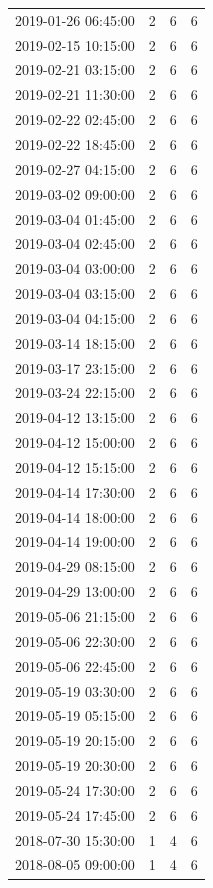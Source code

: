 \begin{tabular}{lrrr}
2019-01-26 06:45:00 & 2 & 6 & 6 \\
2019-02-15 10:15:00 & 2 & 6 & 6 \\
2019-02-21 03:15:00 & 2 & 6 & 6 \\
2019-02-21 11:30:00 & 2 & 6 & 6 \\
2019-02-22 02:45:00 & 2 & 6 & 6 \\
2019-02-22 18:45:00 & 2 & 6 & 6 \\
2019-02-27 04:15:00 & 2 & 6 & 6 \\
2019-03-02 09:00:00 & 2 & 6 & 6 \\
2019-03-04 01:45:00 & 2 & 6 & 6 \\
2019-03-04 02:45:00 & 2 & 6 & 6 \\
2019-03-04 03:00:00 & 2 & 6 & 6 \\
2019-03-04 03:15:00 & 2 & 6 & 6 \\
2019-03-04 04:15:00 & 2 & 6 & 6 \\
2019-03-14 18:15:00 & 2 & 6 & 6 \\
2019-03-17 23:15:00 & 2 & 6 & 6 \\
2019-03-24 22:15:00 & 2 & 6 & 6 \\
2019-04-12 13:15:00 & 2 & 6 & 6 \\
2019-04-12 15:00:00 & 2 & 6 & 6 \\
2019-04-12 15:15:00 & 2 & 6 & 6 \\
2019-04-14 17:30:00 & 2 & 6 & 6 \\
2019-04-14 18:00:00 & 2 & 6 & 6 \\
2019-04-14 19:00:00 & 2 & 6 & 6 \\
2019-04-29 08:15:00 & 2 & 6 & 6 \\
2019-04-29 13:00:00 & 2 & 6 & 6 \\
2019-05-06 21:15:00 & 2 & 6 & 6 \\
2019-05-06 22:30:00 & 2 & 6 & 6 \\
2019-05-06 22:45:00 & 2 & 6 & 6 \\
2019-05-19 03:30:00 & 2 & 6 & 6 \\
2019-05-19 05:15:00 & 2 & 6 & 6 \\
2019-05-19 20:15:00 & 2 & 6 & 6 \\
2019-05-19 20:30:00 & 2 & 6 & 6 \\
2019-05-24 17:30:00 & 2 & 6 & 6 \\
2019-05-24 17:45:00 & 2 & 6 & 6 \\
2018-07-30 15:30:00 & 1 & 4 & 6 \\
2018-08-05 09:00:00 & 1 & 4 & 6 \\

\end{tabular}
